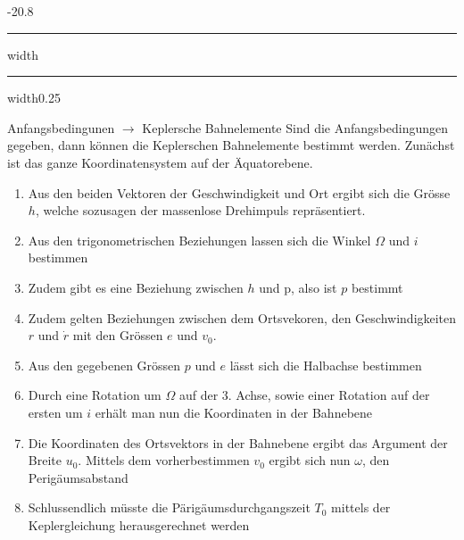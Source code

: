 \documentclass[9pt, landscape, fleqn]{scrartcl}
\makeatletter
\renewcommand{\subsection}{\@startsection{subsection}{1}{0mm}%
{-2\baselineskip}{0.8\baselineskip}%
{\hrule depth 0.2pt width\columnwidth\hrule depth0.75pt
width0.25\columnwidth\vspace*{1.2em}\large\bfseries\rmfamily}}
\makeatother
\begin{document}
\begin{multicols*}{3}
\subsection{Anfangsbedingunen $\rightarrow$ Keplersche Bahnelemente}
Sind die Anfangsbedingungen gegeben, dann können die Keplerschen Bahnelemente bestimmt werden. Zunächst ist das ganze Koordinatensystem auf der Äquatorebene.
\begin{enumerate}
    \item Aus den beiden Vektoren der Geschwindigkeit und Ort ergibt sich die Grösse $h$, welche sozusagen der massenlose Drehimpuls repräsentiert.
    \item Aus den trigonometrischen Beziehungen lassen sich die Winkel $\Omega$ und $i$ bestimmen
    \item Zudem gibt es eine Beziehung zwischen $h$ und p, also ist $p$ bestimmt
    \item Zudem gelten Beziehungen zwischen dem Ortsvekoren, den Geschwindigkeiten $r$ und $\dot{r}$ mit den Grössen $e$ und $v_0$.
    \item Aus den gegebenen Grössen $p$ und $e$ lässt sich die Halbachse bestimmen
    \item Durch eine Rotation um $\Omega$ auf der 3. Achse, sowie einer Rotation auf der ersten um $i$ erhält man nun die Koordinaten in der Bahnebene
    \item Die Koordinaten des Ortsvektors in der Bahnebene ergibt das Argument der Breite $u_0$. Mittels dem vorherbestimmen $v_0$ ergibt sich nun $\omega$, den Perigäumsabstand
    \item Schlussendlich müsste die Pärigäumsdurchgangszeit $T_0$ mittels der Keplergleichung herausgerechnet werden
\end{enumerate}

\end{multicols*}
\end{document}
